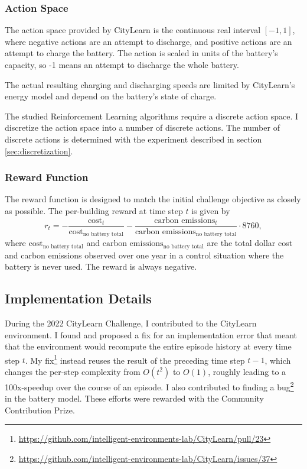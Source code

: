 \subsubsection{Action Space}
The action space provided by CityLearn is the continuous real interval $[-1,1]$, where negative actions are an attempt to discharge, and positive actions are an attempt to charge the battery.
The action is scaled in units of the battery's capacity, so -1 means an attempt to discharge the whole battery.

The actual resulting charging and discharging speeds are limited by CityLearn's energy model and depend on the battery's state of charge.

The studied Reinforcement Learning algorithms require a discrete action space.
I discretize the action space into a number of discrete actions. The number of discrete actions is determined with the experiment described in section \ref{sec:discretization}.

\subsubsection{Reward Function}
The reward function is designed to match the initial challenge objective as closely as possible.
The per-building reward at time step $t$ is given by
$$r_t = - \frac{\text{cost}_t}{\text{cost}_\text{no battery total}}
    - \frac{\text{carbon emissions}_t}{\text{carbon emissions}_\text{no battery total}} \cdot 8760,$$
where $\text{cost}_\text{no battery total}$ and $\text{carbon emissions}_\text{no battery total}$ are the total dollar cost and carbon emissions observed over one year in a control situation where the battery is never used.
The reward is always negative.

\subsection{Implementation Details}
During the 2022 CityLearn Challenge, I contributed to the CityLearn environment.
I found and proposed a fix for an implementation error that meant that the environment would recompute the entire episode history at every time step $t$.
My fix\footnote{\url{https://github.com/intelligent-environments-lab/CityLearn/pull/23}} instead reuses the result of the preceding time step $t-1$, which changes the per-step complexity from $O(t^2)$ to $O(1)$, roughly leading to a 100x-speedup over the course of an episode.
I also contributed to finding a bug\footnote{\url{https://github.com/intelligent-environments-lab/CityLearn/issues/37}} in the battery model.
These efforts were rewarded with the Community Contribution Prize.

